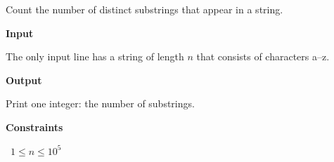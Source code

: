 Count the number of distinct substrings that appear in a string.

\vspace{0.3cm}\noindent\textbf{Input}

The only input line has a string of length $n$ that consists of characters a–z.

\vspace{0.3cm}\noindent\textbf{Output}

Print one integer: the number of substrings.

\vspace{0.3cm}\noindent\textbf{Constraints}

\textbullet\ $1 \le n \le 10^5$